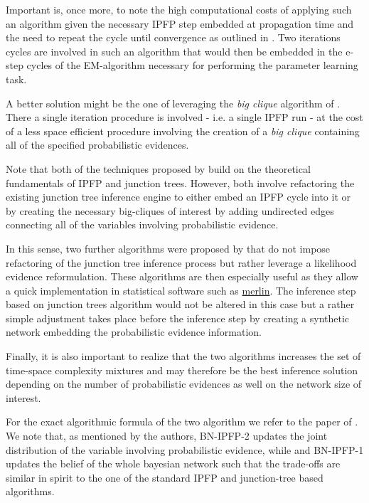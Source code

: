 \documentclass[11pt]{article}
\begin{document}
\begin{article}
Important is, once more, to note the high computational
costs of applying such an algorithm given the necessary IPFP step
embedded at propagation time and the need to repeat the cycle until
convergence as outlined in \cite{Valtorta_2002}. Two iterations cycles are
involved in such an algorithm that would then be embedded in the e-step
cycles of the EM-algorithm necessary for performing the parameter learning task. 

A better solution might be the one of leveraging the \emph{big clique}
algorithm of \cite{Valtorta_2002}. There a single iteration procedure
is involved - i.e. a single IPFP run - at the cost of a less space
efficient procedure involving the creation of a \emph{big clique}
containing all of the specified probabilistic evidences.

Note that both of the techniques proposed by \cite{Valtorta_2002}
build on the theoretical fundamentals of IPFP and junction
trees. However, both involve refactoring the existing junction tree
inference engine to either embed an IPFP cycle into it or by
creating the necessary big-cliques of interest by adding undirected
edges connecting all of the variables involving probabilistic
evidence.

In this sense, two further algorithms were proposed by
\cite{PENG_2010} that do not impose refactoring of the junction tree
inference process but rather leverage a likelihood evidence
reformulation. These algorithms are then especially useful as they
allow a quick implementation in statistical software such as
\href{https://github.com/radum2275/merlin}{merlin}. The inference step based on junction trees algorithm would
not be altered in this case but a rather simple adjustment takes
place before the inference step by creating a synthetic network
embedding the probabilistic evidence information.

Finally, it is also important to realize that the two algorithms
increases the set of time-space complexity mixtures and may
therefore be the best inference solution depending on the number of
probabilistic evidences as well on the network size of interest.

For the exact algorithmic formula of the two algorithm we refer to
the paper of \cite{PENG_2010}. We note that, as mentioned by the
authors, BN-IPFP-2 updates the joint distribution of the variable
involving probabilistic evidence, while and BN-IPFP-1 updates the
belief of the whole bayesian network such that the trade-offs are
similar in spirit to the one of the standard IPFP and junction-tree
based algorithms.


\end{article}
\end{document}
